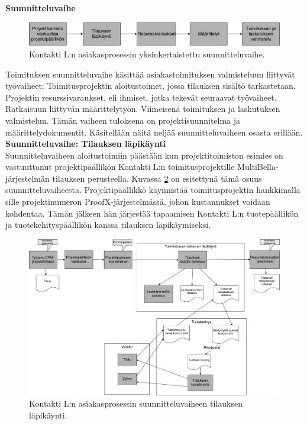 \documentclass[finnish,12pt,a4paper,pdftex]{article}
\begin{document}
\textbf{Suunnitteluvaihe}\\


\begin{figure}[!h]
    \centering
    \includegraphics[scale=0.35]{images/ykssuunn.pdf}
    \caption{Kontakti L:n asiakasprosessin yksinkertaistettu suunnitteluvaihe.}
    \label{fig:ykssuun}
\end{figure}

Toimituksen suunnitteluvaihe käsittää asiakastoimituksen valmisteluun liittyvät työvaiheet: Toimitusprojektin aloitustoimet, jossa tilauksen sisältö tarkastetaan. Projektin resurssivaraukset, eli ihmiset, jotka tekevät seuraavat työvaiheet. Ratkaisuun liittyvän määrittelytyön. Viimeisenä toimituksen ja laskutuksen valmistelun. Tämän vaiheen tuloksena on projektisuunnitelma ja määrittelydokumentit. Käsitellään näitä neljää suunnitteluvaiheen osasta erillään.\\

\textbf{Suunnitteluvaihe: Tilauksen läpikäynti}\\

Suunnitteluvaiheen aloitustoimiin päästään kun projektitoimiston esimies on vastuuttanut projektipäällikön Kontakti L:n toimitusprojektille MultiBella-järjestelmän tilauksen perusteella. Kuvassa \ref{fig:aloitustoimet} on esitettynä tämä osuus suunnitteluvaiheesta. Projektipäällikkö käynnistää toimitusprojektin hankkimalla sille projektinumeron ProofX-järjestelmässä, johon kustannukset voidaan kohdentaa. Tämän jälkeen hän järjestää tapaamisen Kontakti L:n tuotepäällikön ja tuotekehityspäällikön kanssa tilauksen läpikäymiseksi. \\

\begin{figure}[!h]
    \centering
    \includegraphics[scale=0.3]{images/aloitus.pdf}
    \caption{Kontakti L:n asiakasprosessin suunnitteluvaiheen tilauksen läpikäynti.}
    \label{fig:aloitustoimet}
\end{figure}
\end{document}
